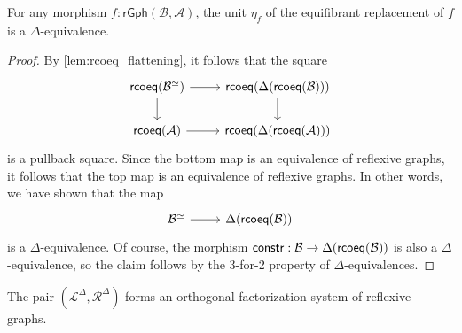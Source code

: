 \begin{lem}
For any morphism $f:\mathsf{rGph}(\mathcal{B},\mathcal{A})$, the unit $\eta_f$ of the equifibrant replacement of $f$ is a $\Delta$-equivalence. 
\end{lem}

\begin{proof}
By \cref{lem:rcoeq_flattening}, it follows that the square
\begin{equation*}
\begin{tikzcd}
\rcoeq(\mathcal{B}^{\eqvsym}) \arrow[d] \arrow[r] & \rcoeq(\Delta(\rcoeq(\mathcal{B}))) \arrow[d] \\
\rcoeq(\mathcal{A}) \arrow[r] & \rcoeq(\Delta(\rcoeq(\mathcal{A})))
\end{tikzcd}
\end{equation*}
is a pullback square. Since the bottom map is an equivalence of reflexive graphs, it follows that the top map is an equivalence of reflexive graphs. In other words, we have shown that the map
\begin{equation*}
\begin{tikzcd}
\mathcal{B}^{\eqvsym} \arrow[r] & \Delta(\rcoeq(\mathcal{B}))
\end{tikzcd}
\end{equation*}
is a $\Delta$-equivalence. Of course, the morphism $\mathsf{constr}:\mathcal{B}\to\Delta(\mathsf{rcoeq}(\mathcal{B}))$ is also a $\Delta$-equivalence, so the claim follows by the 3-for-2 property of $\Delta$-equivalences.
\end{proof}

\begin{thm}
The pair $(\mathcal{L}^\Delta,\mathcal{R}^\Delta)$ forms an orthogonal factorization system of reflexive graphs.
\end{thm}

